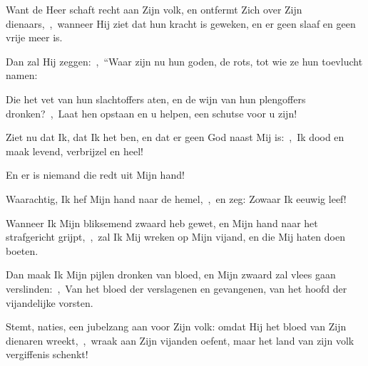 \documentclass[12pt,twoside,a5paper]{article}
\begin{document}
\begin{halfparskip}
  Want de Heer schaft recht aan Zijn volk, en ontfermt Zich over Zijn dienaars,~\sep\ wanneer Hij ziet dat hun kracht is geweken, en er geen slaaf en geen vrije meer is.

  Dan zal Hij zeggen:~\sep\ ``Waar zijn nu hun goden, de rots, tot wie ze hun toevlucht namen:

  Die het vet van hun slachtoffers aten, en de wijn van hun plengoffers dronken?~\sep\ Laat hen opstaan en u helpen, een schutse voor u zijn!

  Ziet nu dat Ik, dat Ik het ben, en dat er geen God naast Mij is:~\sep\ Ik dood en maak levend, verbrijzel en heel!

  En er is niemand die redt uit Mijn hand!

  Waarachtig, Ik hef Mijn hand naar de hemel,~\sep\ en zeg: Zowaar Ik eeuwig leef!

  Wanneer Ik Mijn bliksemend zwaard heb gewet, en Mijn hand naar het strafgericht grijpt,~\sep\ zal Ik Mij wreken op Mijn vijand, en die Mij haten doen boeten.

  Dan maak Ik Mijn pijlen dronken van bloed, en Mijn zwaard zal vlees gaan verslinden:~\sep\ Van het bloed der verslagenen en gevangenen, van het hoofd der vijandelijke vorsten.

  Stemt, naties, een jubelzang aan voor Zijn volk: omdat Hij het bloed van Zijn dienaren wreekt,~\sep\ wraak aan Zijn vijanden oefent, maar het land van zijn volk vergiffenis schenkt!
\end{halfparskip}

\end{document}

